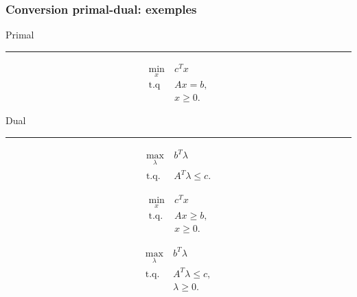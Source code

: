 \documentclass[usepdftitle=false]{beamer}
\begin{document}
\begin{frame}
\frametitle{Conversion primal-dual: exemples}

\begin{minipage}[t]{0.49\textwidth}
\begin{center}
Primal

\mbox{}

\hrule
\begin{align*}
\min_x\ & c^Tx \\
\mbox{t.q } & Ax = b, \\
& x \geq 0. 
\end{align*}
\end{center}
\end{minipage}
\begin{minipage}[t]{0.49\textwidth}
\begin{center}
Dual

\mbox{}

\hrule
\begin{align*}
\max_{\lambda}\ & b^T\lambda \\
\mbox{t.q. } & A^T\lambda \leq c. 
\end{align*}
\end{center}
\end{minipage}

\begin{minipage}[t]{0.49\textwidth}
\begin{center}
\begin{align*}
\min_x\ & c^Tx \\
\mbox{t.q. } & Ax \geq b, \\
& x \geq 0. 
\end{align*}
\end{center}
\end{minipage}
\begin{minipage}[t]{0.49\textwidth}
\begin{center}
\begin{align*}
\max_{\lambda}\ & b^T\lambda \\
\mbox{t.q. } & A^T\lambda \leq c, \\
& \lambda \geq 0. 
\end{align*}
\end{center}
\end{minipage}

\end{frame}
\end{document}
